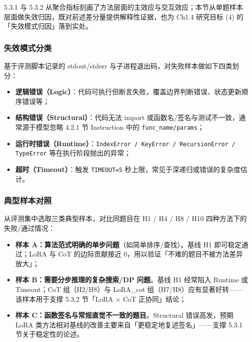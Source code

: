 
5.3.1 与 5.3.2 从聚合指标刻画了方法层面的主效应与交互效应；本节从单题样本层面做失效归因，既对前述差分量提供解释性证据，也为 Ch1.4 研究目标 (4) 的「失效模式归因」落到实处。

\subsubsection{失效模式分类}
基于评测脚本记录的 stdout/stderr 与子进程退出码，对失败样本做如下四类划分：
\begin{itemize}
    \item \textbf{逻辑错误（Logic）}：代码可执行但断言失败，覆盖边界判断错误、状态更新顺序错误等；
    \item \textbf{结构错误（Structural）}：代码无法 import 或函数名/签名与测试不一致，通常源于模型忽略 4.2.1 节 Instruction 中的 \texttt{func\_name/params}；
    \item \textbf{运行时错误（Runtime）}：\texttt{IndexError / KeyError / RecursionError / TypeError} 等在执行阶段抛出的异常；
    \item \textbf{超时（Timeout）}：触发 \texttt{TIMEOUT=5} 秒上限，常见于深递归或错误的复杂度估计。
\end{itemize}

\subsubsection{典型样本对照}
从评测集中选取三类典型样本，对比同题目在 H1 / H4 / H8 / H10 四种方法下的失败/通过情况：
\begin{itemize}
    \item \textbf{样本 A：算法范式明确的单步问题}（如简单排序/查找）。基线 H1 即可稳定通过；LoRA 与 CoT 的边际贡献接近 0，用以验证「不难的题目不被方法差异放大」；
    \item \textbf{样本 B：需要分步推理的复杂搜索/DP 问题}。基线 H1 经常陷入 Runtime 或 Timeout；CoT 组（H2/H8）与 LoRA\_cot 组（H7/H8）应有显著好转——该样本用于支撑 5.3.2 节「LoRA $\times$ CoT 正协同」结论；
    \item \textbf{样本 C：函数签名与常规直觉不一致的题目}。Structural 错误高发，预期 LoRA 类方法相对基线的改善主要来自「更稳定地复述签名」——支撑 5.3.1 节关于稳定性的论述。
\end{itemize}


